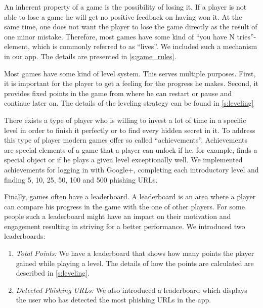 \begin{description}[leftmargin=0cm]
\item[Lives:] An inherent property of a game is the possibility of losing it.
If a player is not able to lose a game he will get no positive feedback on having won it.
At the same time, one does not want the player to lose the game directly as the result of one minor mistake.
Therefore, most games have some kind of ``you have N tries''-element, which is commonly referred to as ``lives''.
We included such a mechanism in our app.
The details are presented in \autoref{s:game_rules}.
\item[Levels:] Most games have some kind of level system.
This serves multiple purposes.
First, it is important for the player to get a feeling for the progress he makes.
Second, it provides fixed points in the game from where he can restart or pause and continue later on.
The details of the leveling strategy can be found in \autoref{s:leveling}

\item[Achievements:] There exists a type of player who is willing to invest a lot of time in a specific level in order to finish it perfectly or to find every hidden secret in it.
To address this type of player modern games offer so called ``achievements''.
Achievements are special elements of a game that a player can unlock if he, for example, finds a special object or if he plays a given level exceptionally well. 
We implemented achievements for logging in with Google+, completing each introductory level and finding 5, 10, 25, 50, 100 and 500 phishing URLs. 

\item[Leaderboards:] Finally, games often have a leaderboard.
A leaderboard is an area where a player can compare his progress in the game with the one of other players.
For some people such a leaderboard might have an impact on their motivation and engagement resulting in striving for a better performance.
We introduced two leaderboards:
\begin{enumerate}
\item \textit{Total Points:} We have a leaderboard that shows how many points the player gained while playing a level. The details of how the points are calculated are described in \autoref{s:leveling}.
\item \textit{Detected Phishing URLs:} We also introduced a leaderboard which displays the user who has detected the most phishing URLs in the app. 
\end{enumerate}

\end{description}

